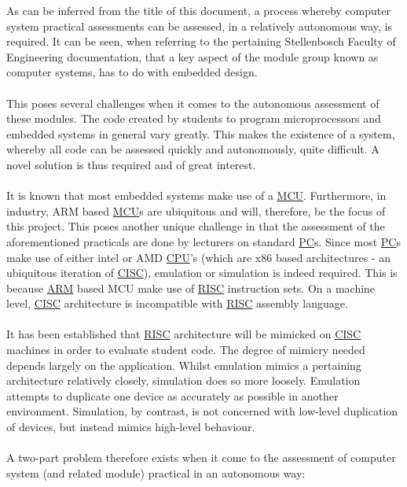 As can be inferred from the title of this document, a process whereby computer system practical assessments can be assessed, in a relatively autonomous way, is required. It can be seen, when referring to the pertaining Stellenbosch Faculty of Engineering documentation, that a key aspect of the module group known as computer systems, has to do with embedded design. \cite{Stelle2020}
\\\\
This poses several challenges when it comes to the autonomous assessment of these modules. The code created by students to program microprocessors and embedded systems in general vary greatly. This makes the existence of a system, whereby all code can be assessed quickly and autonomously, quite difficult. A novel solution is thus required and of great interest.
\\\\
It is known that most embedded systems make use of a \hyperref[listAbr]{MCU}. Furthermore, in industry, ARM based \hyperref[listAbr]{MCU}s are ubiquitous and will, therefore, be the focus of this project. This poses another unique challenge in that the assessment of the aforementioned practicals are done by lecturers on standard \hyperref[listAbr]{PC}s. Since most \hyperref[listAbr]{PC}s make use of either intel\textsuperscript{{\tiny{\textregistered}}} or AMD\textsuperscript{{\tiny{\textregistered}}} \hyperref[listAbr]{CPU}'s (which are x86 based architectures - an ubiquitous iteration of \hyperref[listAbr]{CISC}), emulation or simulation is indeed required. This is because \hyperref[listAbr]{ARM} based MCU make use of \hyperref[listAbr]{RISC} instruction sets. On a machine level, \hyperref[listAbr]{CISC} architecture is incompatible with \hyperref[listAbr]{RISC} assembly language.
\\\\
It has been established that \hyperref[listAbr]{RISC} architecture will be mimicked on \hyperref[listAbr]{CISC} machines in order to evaluate student code. The degree of mimicry needed depends largely on the application. Whilst emulation mimics a pertaining architecture relatively closely, simulation does so more loosely. Emulation attempts to duplicate one device as accurately as possible in another environment. Simulation, by contrast, is not concerned with low-level duplication of devices, but instead mimics high-level behaviour.\cite{Chris}
\\\\
A two-part problem therefore exists when it come to the assessment of computer system (and related module) practical in an autonomous way:
